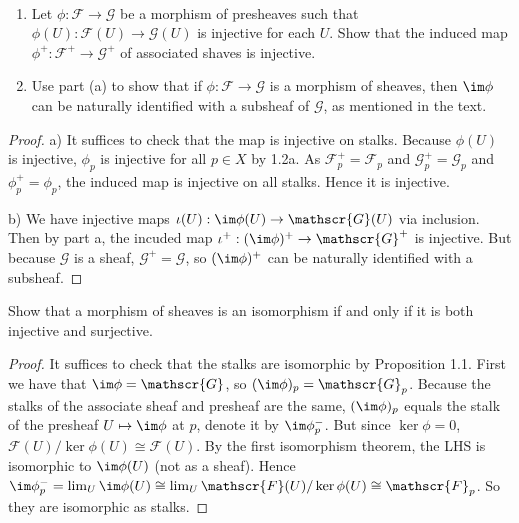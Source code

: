 \begin{exercise}%
	~
	\begin{enumerate}
		\item Let $\phi :\mathscr{F}\to \mathscr{G} $ be a morphism of presheaves such that $\phi (U): \mathscr{F}(U) \to \mathscr{G}(U) $ is injective for each $U $. Show that the induced map $\phi ^+: \mathscr{F}^+ \to \mathscr{G}^+ $ of associated shaves is injective.
		\item Use part (a) to show that if $\phi : \mathscr{F}\to \mathscr{G} $ is a morphism of sheaves, then $\im \phi  $ can be naturally identified with a subsheaf of $\mathscr{G} $, as mentioned in the text.
	\end{enumerate}
\end{exercise}
\begin{proof}
	a) It suffices to check that the map is injective on stalks.
	Because $\phi(U)$ is injective, $\phi_p $ is injective for all $p \in X $ by 1.2a.
	As $\mathscr{F}^+_p = \mathscr{F}_p $ and $\mathscr{G}^+_p = \mathscr{G}_p $ and $\phi^+_p = \phi_p $, the induced map is injective on all stalks.
	Hence it is injective.

	b) 
	We have injective maps $\iota (U): \im \phi (U) \to \mathscr{G}(U) $ via inclusion.
	Then by part a, the incuded map $\iota^+: (\im \phi)^+ \to \mathscr{G}^+$ is injective.
	But because $\mathscr{G} $ is a sheaf, $\mathscr{G}^+ = \mathscr{G} $, so $(\im \phi )^+ $ can be naturally identified with a subsheaf.
\end{proof}
%
\begin{exercise}%
	Show that a morphism of sheaves is an isomorphism if and only if it is both injective and surjective. 
\end{exercise}
\begin{proof}
	It suffices to check that the stalks are isomorphic by Proposition 1.1.
	First we have that $\im \phi = \mathscr{G} $, so $(\im \phi)_p = \mathscr{G}_p $.
	Because the stalks of the associate sheaf and presheaf are the same, $(\im \phi)_p $ equals the stalk of the presheaf $U\mapsto \im \phi $ at $p $, denote it by $\im \phi^-_p $.
	But since $\ker \phi = 0 $, $\mathscr{F}(U) / \ker \phi(U) \cong \mathscr{F}(U)$.
	By the first isomorphism theorem, the LHS is isomorphic to $\im \phi(U) $ (not as a sheaf).
	Hence $\im\phi^-_p = \lim_{U} \im\phi(U) \cong \lim_U \mathscr{F}(U) / \ker \phi(U) \cong \mathscr{F}_p$.
	So they are isomorphic as stalks.
\end{proof}

